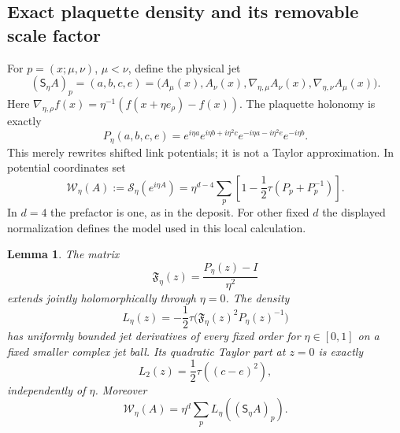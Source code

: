 \documentclass[11pt]{article}
\newtheorem{lemma}[theorem]{Lemma}
\theoremstyle{remark}
\begin{document}
\subsection{Exact plaquette density and its removable scale factor}

For $p=(x;\mu,\nu)$, $\mu<\nu$, define the physical jet
\begin{equation}\label{wf-jet}
 (\mathsf S_\eta A)_p=(a,b,c,e)
  =\bigl(A_\mu(x),A_\nu(x),
       \nabla_{\eta,\mu}A_\nu(x),
       \nabla_{\eta,\nu}A_\mu(x)\bigr).
\end{equation}
Here $\nabla_{\eta,\rho}f(x)
=\eta^{-1}(f(x+\eta e_\rho)-f(x))$. The plaquette
holonomy is exactly
\begin{equation}\label{wf-plaquette}
 P_\eta(a,b,c,e)
  =e^{i\eta a}e^{i\eta b+i\eta^2c}
                    e^{-i\eta a-i\eta^2e}e^{-i\eta b}.
\end{equation}
This merely rewrites shifted link potentials; it is not a
Taylor approximation. In potential coordinates set
\begin{equation}\label{wf-action}
 \mathcal W_\eta(A):=\mathcal S_\eta(e^{i\eta A})
   =\eta^{d-4}\sum_p
          \left[1-\frac12\tau(P_p+P_p^{-1})\right].
\end{equation}
In $d=4$ the prefactor is one, as in the deposit. For other
fixed $d$ the displayed normalization defines the model used
in this local calculation.

\begin{lemma}\label{wf-removable}
The matrix
\[
 \mathfrak F_\eta(z)=\frac{P_\eta(z)-I}{\eta^2}
\]
extends jointly holomorphically through $\eta=0$. The density
\begin{equation}\label{wf-density}
 L_\eta(z)=-\frac12\tau\bigl(\mathfrak F_\eta(z)^2
                                              P_\eta(z)^{-1}\bigr)
\end{equation}
has uniformly bounded jet derivatives of every fixed order
for $\eta\in[0,1]$ on a fixed smaller complex jet ball. Its
quadratic Taylor part at $z=0$ is exactly
\begin{equation}\label{wf-quadratic}
 L_2(z)=\frac12\tau((c-e)^2),
\end{equation}
independently of $\eta$. Moreover
\begin{equation}\label{wf-exact-action}
 \mathcal W_\eta(A)=\eta^d\sum_p
                           L_\eta((\mathsf S_\eta A)_p).
\end{equation}
\end{lemma}
\end{document}
